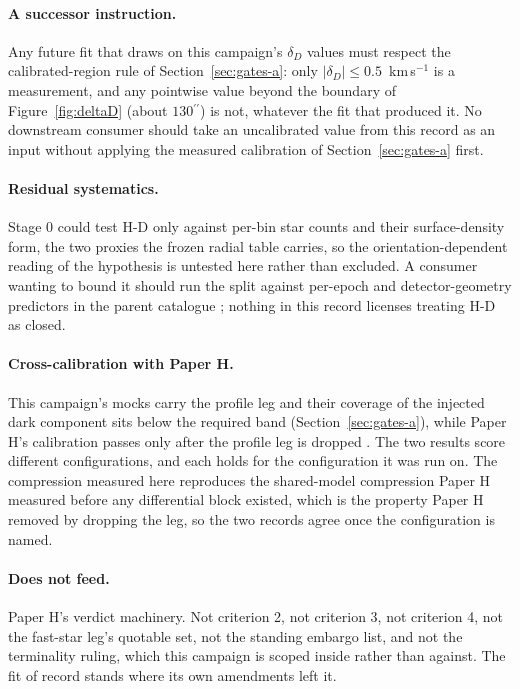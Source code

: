 \documentclass[11pt]{article}
\newcommand{\as}{\ensuremath{^{\prime\prime}}}
\newcommand{\dD}{\ensuremath{\delta_D}}
\begin{document}
\paragraph{A successor instruction.} Any future fit that draws on this campaign's \dD{} values must respect the calibrated-region rule of Section~\ref{sec:gates-a}: only $|\dD| \leq 0.5$~km\,s$^{-1}$ is a measurement, and any pointwise value beyond the boundary of Figure~\ref{fig:deltaD} (about $130\as$) is not, whatever the fit that produced it. No downstream consumer should take an uncalibrated value from this record as an input without applying the measured calibration of Section~\ref{sec:gates-a} first.

\paragraph{Residual systematics.} Stage 0 could test H-D only against per-bin star counts and their surface-density form, the two proxies the frozen radial table carries, so the orientation-dependent reading of the hypothesis is untested here rather than excluded. A consumer wanting to bound it should run the split against per-epoch and detector-geometry predictors in the parent catalogue \citep{Haberle2024oMEGACatII,Haberle2025oMEGACatVI}; nothing in this record licenses treating H-D as closed.

\paragraph{Cross-calibration with Paper H.} This campaign's mocks carry the profile leg and their coverage of the injected dark component sits below the required band (Section~\ref{sec:gates-a}), while Paper H's calibration passes only after the profile leg is dropped \citep{HCalReport2026}. The two results score different configurations, and each holds for the configuration it was run on. The compression measured here reproduces the shared-model compression Paper H measured before any differential block existed, which is the property Paper H removed by dropping the leg, so the two records agree once the configuration is named.

\paragraph{Does not feed.} Paper H's verdict machinery. Not criterion 2, not criterion 3, not criterion 4, not the fast-star leg's quotable set, not the standing embargo list, and not the terminality ruling, which this campaign is scoped inside rather than against. The fit of record stands where its own amendments left it.
\end{document}
